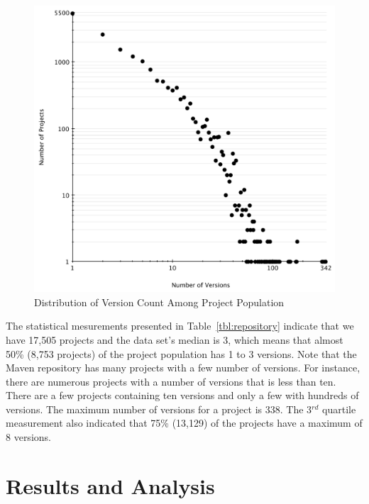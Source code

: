 \documentclass[conference]{llncs}
\begin{document}
\begin{figure}
	\centering
	\includegraphics[scale=0.6]{version_count.pdf}
	\caption{Distribution of
Version Count Among Project Population}
	\label{fig:version-count}
\end{figure}

The statistical mesurements presented in Table~\ref{tbl:repository}
indicate that we have 17,505 projects and the data set's median
is 3, which means that almost 50\% (8,753 projects) of the project
population has 1 to 3 versions.
Note that the Maven repository has many projects with a
few number of versions. For instance, there are numerous projects with a
number of versions that is less than ten.
There are a few projects containing ten
versions and only a few with hundreds of versions. The maximum number of
versions for a project is 338. The 3$^{rd}$ quartile measurement
also indicated that 75\% (13,129) of the projects have a maximum of 8 versions.

\section{Results and Analysis}
\label{sec:res}
\end{document}
